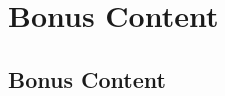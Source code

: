 \documentclass[
  letterpaper,
  DIV=11,
  numbers=noendperiod]{scrreprt}
\begin{document}
\part{Bonus Content}

\chapter{Bonus Content}\label{bonus-content-1}
\end{document}
